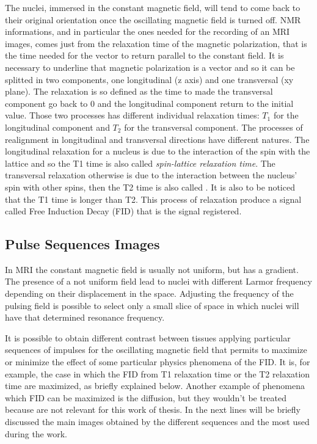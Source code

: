 \documentclass{standalone}
\begin{document}
The nuclei, immersed in the constant magnetic field, will tend  to come back to their original orientation once the oscillating magnetic field is turned off.
NMR informations, and in particular the ones needed for the recording of an MRI images, comes just from the relaxation time of the magnetic polarization, that is the time needed for the vector to return parallel to the constant field. It is necessary to underline that magnetic polarization is a vector and so it can be splitted in two components, one longitudinal (z axis) and one transversal (xy plane). The relaxation is so defined as the time to made the transversal component go back to $0$ and the longitudinal component return to the initial value. Those two processes has different individual relaxation times: $T_1$ for the longitudinal component and $T_2$ for the transversal component.
The processes of realignment in longitudinal and transversal directions have different natures.
The longitudinal relaxation for a nucleus is due to the interaction of the spin with the lattice and so the T1 time is also called \textit{spin-lattice relaxation time}.
The transversal relaxation otherwise is due to the interaction between the nucleus' spin with other spins, then the T2 time is also called .
It is also to be noticed that the T1 time is longer than T2.
This process of relaxation produce a signal called Free Induction Decay (FID) that is the signal registered.

\subsection{Pulse Sequences Images}
In MRI the constant magnetic field is usually not uniform, but has a gradient. The presence of a not uniform field lead to nuclei with different Larmor frequency depending on their displacement in the space. Adjusting the frequency of the pulsing field is possible to select only a small slice of space in which nuclei will have that determined resonance frequency.

It is possible to obtain different contrast between tissues applying particular sequences of impulses for the oscillating magnetic field that permits to maximize or minimize the effect of some particular physics phenomena of the FID. It is, for example, the case in which the FID from T1 relaxation time or the T2 relaxation time are maximized, as briefly explained below. Another example of phenomena which FID can be maximized is the diffusion, but they wouldn't be treated because are not relevant for this work of thesis. In the next lines will be briefly discussed the main images obtained by the different sequences and the most used during the work.
\end{document}
